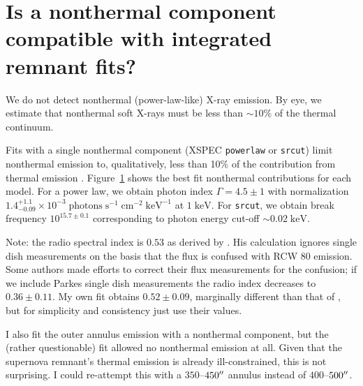 \documentclass[preprint2,tighten,trackchanges]{aastex6}
\newcommand*{\mt}{\mathrm}
\newcommand*{\unit}[1]{\;\mt{#1}}  %
\newcommand*{\abt}{\mathord{\sim}} %
\begin{document}
\section{Is a nonthermal component compatible with integrated remnant fits?}

We do not detect nonthermal (power-law-like) X-ray emission.
By eye, we estimate that nonthermal soft X-rays must be less than $\abt 10\%$
of the thermal continuum.

Fits with a single nonthermal component (XSPEC \texttt{powerlaw} or
\texttt{srcut}) limit nonthermal emission to, qualitatively, less than 10\% of
the contribution from thermal emission \citep[cf.][]{reynolds1999}.
Figure~\ref{fig:nonthermal} shows the best fit nonthermal contributions for
each model.
For a power law, we obtain photon index $\Gamma = 4.5 \pm 1$ with
normalization $1.4^{+1.1}_{-0.09} \times 10^{-3} \unit{photons\;s^{-1}\;cm^{-2}\;keV^{-1}}$
at $1 \unit{keV}$.
For \texttt{srcut}, we obtain break frequency $10^{15.7 \pm 0.1}$
corresponding to photon energy cut-off $\abt 0.02 \unit{keV}$.

Note: the radio spectral index is $0.53$ as derived by \citet{gaensler1998}.
His calculation ignores single dish measurements on the basis that the flux
is confused with RCW 80 emission.  Some authors made efforts to correct their
flux measurements for the confusion; if we include Parkes single dish
measurements the radio index decreases to $0.36 \pm 0.11$.
My own fit obtains $0.52 \pm 0.09$, marginally different than that of
\citet{gaensler1998}, but for simplicity and consistency just use their values.

I also fit the outer annulus emission with a nonthermal component, but the
(rather questionable) fit allowed no nonthermal emission at all.
Given that the supernova remnant's thermal emission is already ill-constrained,
this is not surprising.
I could re-attempt this with a $350$--$450\mbox{$^{\prime\prime}$}$ annulus instead of
$400$--$500\mbox{$^{\prime\prime}$}$.  %

\begin{figure*}[]
    \label{fig:nonthermal}
\end{figure*}
\end{document}
